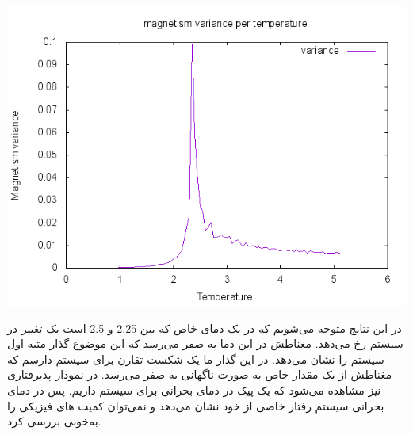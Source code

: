 \documentclass[a4paper,12pt]{article}
\begin{document}
\begin{center}
\includegraphics[scale=.8]{VARM.png}
\end{center}

در این نتایج متوجه می‌شویم که در یک دمای خاص که بین
2.25 و 2.5 است یک تغییر در سیستم رخ می‌دهد.
مغناطش در این دما به صفر می‌رسد که این موضوع گذار متبه اول سیستم را نشان می‌دهد.
در این گذار ما یک شکست تقارن برای سیستم دارسم که مغناطش از یک مقدار خاص به صورت 
ناگهانی به صفر می‌رسد.
در نمودار پذیرفتاری نیز مشاهده می‌شود که یک پیک در دمای
بحرانی برای سیستم داریم.
پس در دمای بحرانی سیستم رفتار خاصی از خود نشان می‌دهد و نمی‌توان کمیت های 
فیزیكی را به‌خوبی بررسی کرد.
\end{document}
